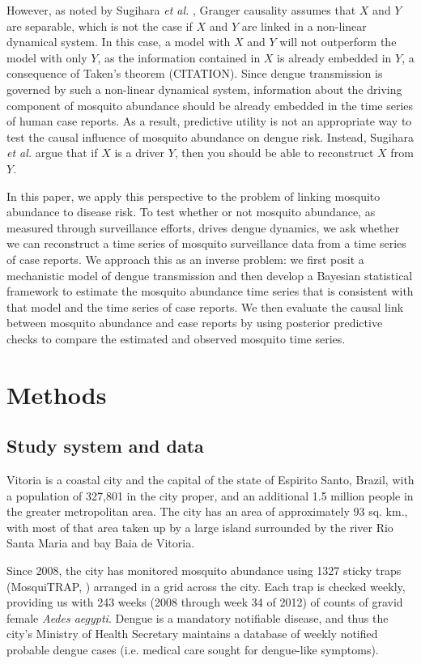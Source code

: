 \documentclass[10pt,letterpaper]{article}
\begin{document}
However, as noted by Sugihara \emph{et al.} \cite{Sugihara2012a}, Granger causality assumes that $X$ and $Y$ are separable, which is not the case if $X$ and $Y$ are linked in a non-linear dynamical system.
In this case, a model with $X$ and $Y$ will not outperform the model with only $Y$, as the information contained in $X$ is already embedded in $Y$, a consequence of Taken's theorem (CITATION). 
Since dengue transmission is governed by such a non-linear dynamical system, information about the driving component of mosquito abundance should be already embedded in the time series of human case reports.
As a result, predictive utility is not an appropriate way to test the causal influence of mosquito abundance on dengue risk.
Instead, Sugihara \emph{et al.} argue that if $X$ is a driver $Y$, then you should be able to reconstruct $X$ from $Y$.

In this paper, we apply this perspective to the problem of linking mosquito abundance to disease risk.
To test whether or not mosquito abundance, as measured through surveillance efforts, drives dengue dynamics, we ask whether we can reconstruct a time series of mosquito surveillance data from a time series of case reports.
We approach this as an inverse problem: we first posit a mechanistic model of dengue transmission and then develop a Bayesian statistical framework to estimate the mosquito abundance time series that is consistent with that model and the time series of case reports.
We then evaluate the causal link between mosquito abundance and case reports by using posterior predictive checks to compare the estimated and observed mosquito time series.  


\section*{Methods}

\subsection*{Study system and data}

Vitoria is a coastal city and the capital of the state of Espirito Santo, Brazil, with a population of 327,801 in the city proper, and an additional 1.5 million people in the greater metropolitan area.  
The city has an area of approximately 93 sq. km., with most of that area taken up by a large island surrounded by the river Rio Santa Maria and bay Baia de Vitoria.  

Since 2008, the city has monitored mosquito abundance using 1327 sticky traps (MosquiTRAP, \cite{Eiras2009}) arranged in a grid across the city.
Each trap is checked weekly, providing us with 243 weeks (2008 through week 34 of 2012) of counts of gravid female \emph{Aedes aegypti}.
Dengue is a mandatory notifiable disease, and thus the city's Ministry of Health Secretary maintains a database of weekly notified probable dengue cases (i.e. medical care sought for dengue-like symptoms).
\end{document}
